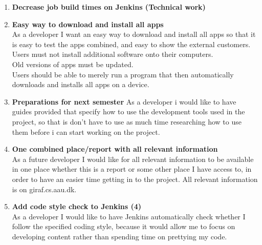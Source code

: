 \begin{enumerate}
	\item \textbf{Decrease job build times on Jenkins (Technical work)}\\
	
	\item \textbf{Easy way to download and install all apps}\\
	As a developer I want an easy way to download and install all apps so that it is easy to test the apps combined, and easy to show the external customers.\\
	Users must not install additional software onto their computers.\\
	Old versions of apps must be updated.\\
	Users should be able to merely run a program that then automatically downloads and installs all apps on a device.
	
	\item \textbf{Preparations for next semester}
	As a developer i would like to have guides provided that specify how to use the development tools used in the project, so that is don’t have to use as much time researching how to use them before i can start working on the project.
	
	\item \textbf{One combined place/report with all relevant information}\\
	As a future developer I would like for all relevant information to be available in one place whether this is a report or some other place I have access to, in order to have an easier time getting in to the project. All relevant information is on giraf.cs.aau.dk.
	
	\item \textbf{Add code style check to Jenkins (4)}\\
	As a developer I would like to have Jenkins automatically check whether I follow the specified coding style, because it would allow me to focus on developing content rather than spending time on prettying my code.
\end{enumerate}
